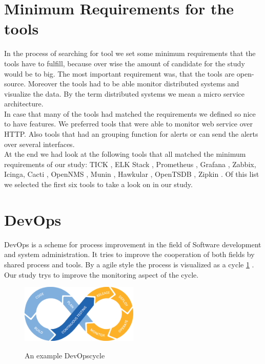 \section{Minimum Requirements for the tools}
\label{minimumrequire}
In the process of searching for tool we set some minimum requirements that the tools have to fulfill, because over wise the amount of candidate for the study would be to big. The most important requirement was, that the tools are open-source. Moreover the tools had to be able monitor distributed systems and visualize the data. By the term distributed systems we  mean a micro service architecture. \\
In case that many of the tools had matched the requirements we defined so nice to have features. We preferred tools that were able to monitor web service over HTTP. Also tools that had an grouping function for alerts or can send the alerts over several interfaces. \\
At the end we had look at the following tools that all matched the minimum requirements of our study: TICK \cite{tick}, ELK Stack \cite{elk}, Prometheus \cite{prometheus}, Grafana \cite{grafana} \cite{grafana}, Zabbix\cite{zabbix}, Icinga\cite{icinga}, Cacti \cite{cacti}, OpenNMS \cite{opennms}, Munin \cite{munin}, Hawkular \cite{hawkular}, OpenTSDB \cite{opentsdb}, Zipkin \cite{zipkin}. Of this list we selected the first six tools to take a look on in our study.   


\section{DevOps}
\label{devops}
DevOps is a scheme for process improvement in the field of Software development and system administration\cite{Bass:2015:DSA:2810087}. It tries to improve the cooperation of both fields by shared process and tools.
By a agile style the process is visualized as a cycle \cref{fig:devopscycle} . Our study trys to improve the monitoring aspect of the cycle.
\begin{figure}
	\centering
	\includegraphics[width=0.5\textwidth]{Bilder/devopscycle}
	\caption{An example DevOpscycle}
	\label{fig:devopscycle}
	\cite{Devops}
\end{figure}
